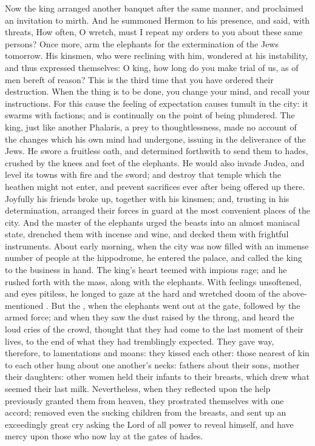 {Now the king arranged another banquet after the same manner, and proclaimed an invitation to mirth.
And he summoned Hermon to his presence, and said, with threats, How often, O wretch, must I repeat my orders to you about these same persons?
Once more, arm the elephants for the extermination of the Jews tomorrow.
His kinsmen, who were reclining with him, wondered at his instability, and thus expressed themselves:
O king, how long do you make trial of us, as of men bereft of reason? This is the third time that you have ordered their destruction. When the thing is to be done, you change your mind, and recall your instructions.
For this cause the feeling of expectation causes tumult in the city: it swarms with factions; and is continually on the point of being plundered.
The king, just like another Phalaris, a prey to thoughtlessness, made no account of the changes which his own mind had undergone, issuing in the deliverance of the Jews. He swore a fruitless oath, and determined forthwith to send them to hades, crushed by the knees and feet of the elephants.
He would also invade Judea, and level its towns with fire and the sword; and destroy that temple which the heathen might not enter, and prevent sacrifices ever after being offered up there.
Joyfully his friends broke up, together with his kinsmen; and, trusting in his determination, arranged their forces in guard at the most convenient places of the city.
And the master of the elephants urged the beasts into an almost maniacal state, drenched them with incense and wine, and decked them with frightful instruments.
About early morning, when the city was now filled with an immense number of people at the hippodrome, he entered the palace, and called the king to the business in hand.
The king’s heart teemed with impious rage; and he rushed forth with the mass, along with the elephants. With feelings unsoftened, and eyes pitiless, he longed to gaze at the hard and wretched doom of the above-mentioned
{}.
But the
{}, when the elephants went out at the gate, followed by the armed force; and when they saw the dust raised by the throng, and heard the loud cries of the crowd,
thought that they had come to the last moment of their lives, to the end of what they had tremblingly expected. They gave way, therefore, to lamentations and moans: they kissed each other: those nearest of kin to each other hung about one another’s necks: fathers about their sons, mother their daughters: other women held their infants to their breasts, which drew what seemed their last milk.
Nevertheless, when they reflected upon the help previously granted them from heaven, they prostrated themselves with one accord; removed even the sucking children from the breasts, and
sent up an exceedingly great cry asking the Lord of all power to reveal himself, and have mercy upon those who now lay at the gates of hades.

}
